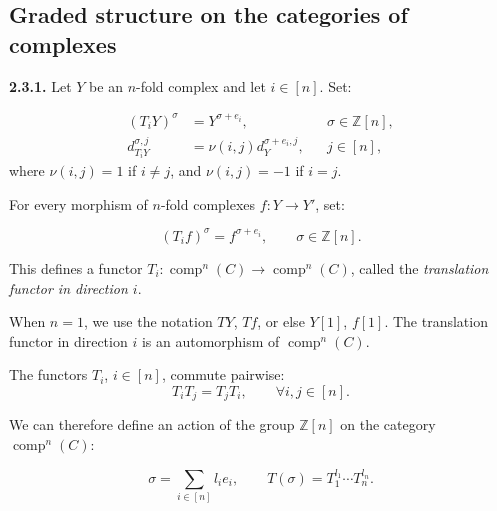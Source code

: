 %
\subsection{Graded structure on the categories of complexes}

\noindent\textbf{2.3.1.}\quad
Let $Y$ be an $n$-fold complex and let $i\in[n]$. Set:

\begin{equation}
  \begin{aligned}
    (T_iY)^\sigma&=Y^{\sigma+e_i},
      &&\sigma\in\mathbb Z[n],\\
    d_{T_iY}^{\sigma,j}&=\nu(i,j)d_Y^{\sigma+e_i,j},
      &&j\in[n],
  \end{aligned}
  \tag{2.3.1.1}
\end{equation}
where $\nu(i,j)=1$ if $i\ne j$, and $\nu(i,j)=-1$ if $i=j$.

For every morphism of $n$-fold complexes
$f\colon Y\longrightarrow Y'$, set:

\begin{equation}
  (T_if)^\sigma=f^{\sigma+e_i},
  \qquad \sigma\in\mathbb Z[n].
  \tag{2.3.1.2}
\end{equation}

This defines a functor
$T_i\colon\operatorname{comp}^{n}(C)\longrightarrow
\operatorname{comp}^{n}(C)$, called the
\emph{translation functor in direction $i$}.

When $n=1$, we use the notation $TY$, $Tf$, or else $Y[1]$, $f[1]$.
The translation functor in direction $i$ is an automorphism of
$\operatorname{comp}^{n}(C)$.

The functors $T_i$, $i\in[n]$, commute pairwise:
\begin{equation}
  T_iT_j=T_jT_i,
  \qquad \forall i,j\in[n].
  \tag{2.3.1.3}
\end{equation}

We can therefore define an action of the group $\mathbb Z[n]$ on the category
$\operatorname{comp}^{n}(C)$:

\begin{equation}
  \sigma=\sum_{i\in[n]}l_ie_i,
  \qquad
  T(\sigma)=T_1^{l_1}\cdots T_n^{l_n}.
  \tag{2.3.1.4}
\end{equation}

